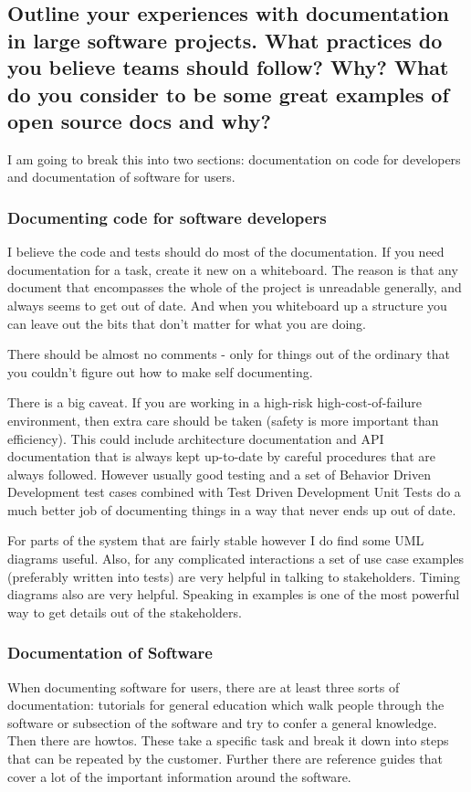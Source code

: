 \documentclass[letter,12pt]{article}
\begin{document}
\subsection{Outline your experiences with documentation in large software projects. What practices do you believe teams should follow? Why?  What do you consider to be some great examples of open source docs and why?}

I am going to break this into two sections: documentation on code for developers and documentation of software for users.
\subsubsection{Documenting code for software developers}
I believe the code and tests should do most of the documentation. If you need documentation for a task, create it new on a whiteboard. The reason is that any document that encompasses the whole of the project is unreadable generally, and always seems to get out of date. And when you whiteboard up a structure you can leave out the bits that don't matter for what you are doing.

There should be almost no comments - only for things out of the ordinary that you couldn't figure out how to make self documenting.

There is a big caveat. If you are working in a high-risk high-cost-of-failure environment, then extra care should be taken (safety is more important than efficiency). This could include architecture documentation and API documentation that is always kept up-to-date by careful procedures that are always followed. However usually good testing and a set of Behavior Driven Development test cases combined with Test Driven Development Unit Tests do a much better job of documenting things in a way that never ends up out of date.

For parts of the system that are fairly stable however I do find some UML diagrams useful. Also, for any complicated interactions a set of use case examples (preferably written into tests) are very helpful in talking to stakeholders. Timing diagrams also are very helpful. Speaking in examples is one of the most powerful way to get details out of the stakeholders.

\subsubsection{Documentation of Software}
When documenting software for users, there are at least three sorts of documentation: tutorials for general education which walk people through the software or subsection of the software and try to confer a general knowledge. Then there are howtos. These take a specific task and break it down into steps that can be repeated by the customer. Further there are reference guides that cover a lot of the important information around the software.
\end{document}
